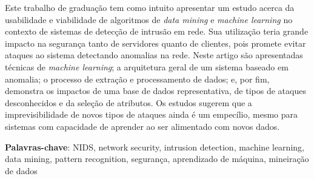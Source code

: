 %
%

Este trabalho de graduação tem como intuito apresentar um estudo acerca da usabilidade e viabilidade de
algoritmos de \textit{data mining} e \textit{machine learning} no contexto de sistemas de detecção de
intrusão em rede. Sua utilização teria grande impacto na segurança tanto de servidores quanto de clientes,
pois promete evitar ataques ao sistema detectando anomalias na rede.
Neste artigo são apresentadas técnicas de \textit{machine learning}; a arquitetura geral
de um sistema baseado em anomalia; o processo de extração e processamento de dados; e, por fim, demonstra
os impactos de uma base de dados representativa, de tipos de ataques desconhecidos e da seleção de atributos.
Os estudos sugerem que a imprevisibilidade de novos tipos de ataques ainda é um empecílio, mesmo para
sistemas com capacidade de aprender ao ser alimentado com novos dados.

\noindent \textbf{Palavras-chave}: NIDS, network security, intrusion detection, machine learning, data mining,
pattern recognition, segurança, aprendizado de máquina, mineiração de dados
